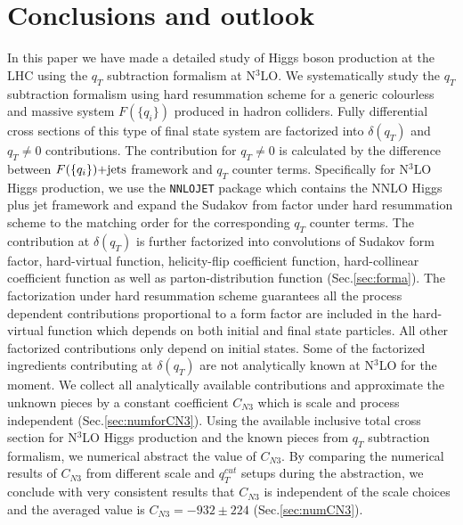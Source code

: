 \documentclass[12pt]{article}
\begin{document}
\section{Conclusions and outlook}
\label{Sec:conclu}
In this paper we have made a detailed study of Higgs boson production at the LHC using the $q_T$ subtraction formalism at N$^3$LO. We systematically study the $q_T$ subtraction formalism using hard resummation scheme for a generic colourless and massive system $F(\{q_i\})$ produced in hadron colliders. Fully differential cross sections of this type of final state system are factorized into $\delta(q_T)$ and $q_T\ne 0$ contributions. The contribution for $q_T\ne 0$ is calculated by the difference between $F(\{q_i\})\rm{+jets}$ framework and $q_T$ counter terms. Specifically for N$^3$LO Higgs production, we use the \texttt{NNLOJET} package which contains the NNLO Higgs plus jet framework and expand the Sudakov from factor under hard resummation scheme to the matching order for the corresponding $q_T$ counter terms. The contribution at $\delta(q_T)$ is further factorized into convolutions of Sudakov form factor, hard-virtual function, helicity-flip coefficient function, hard-collinear coefficient function as well as parton-distribution function (Sec.\ref{sec:forma}). The factorization under hard resummation scheme guarantees all the process dependent contributions proportional to a form factor are included in the hard-virtual function which depends on both initial and final state particles. All other factorized contributions only depend on initial states. Some of the factorized ingredients contributing at $\delta(q_T)$ are not analytically known at N$^3$LO for the moment. We collect all analytically available contributions and approximate the unknown pieces by a constant coefficient $C_{N3}$ which is scale and process independent (Sec.\ref{sec:numforCN3}). Using the available inclusive total cross section for N$^3$LO Higgs production and the known pieces from $q_T$ subtraction formalism, we numerical abstract the value of $C_{N3}$. By comparing the numerical results of $C_{N3}$ from different scale and $q_T^{cut}$ setups during the abstraction, we conclude with very consistent results that $C_{N3}$ is independent of the scale choices and the averaged value is $C_{N3}=-932\pm 224$ (Sec.\ref{sec:numCN3}).
\end{document}
